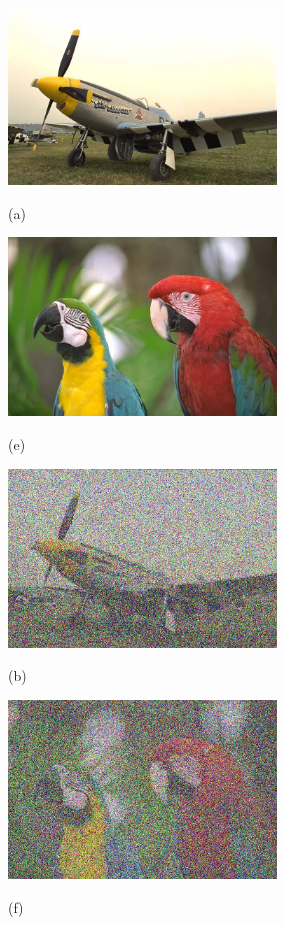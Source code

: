 	\begin{figure}[!]
		\centering
		\begin{minipage}[t]{.49\linewidth}
			\includegraphics[width=2.8in]{LIVE/REF/plane.jpg}
			\centerline{(a)}
		\end{minipage}
		\begin{minipage}[t]{.49\linewidth}
			\includegraphics[width=2.8in]{LIVE/REF/parrots.jpg}
			\centerline{(e)}
		\end{minipage}
	
		\begin{minipage}[t]{.49\linewidth}
			\includegraphics[width=2.8in]{LIVE/WN/img105.jpg}
			\centerline{(b)}
		\end{minipage}
		\begin{minipage}[t]{.49\linewidth}
			\includegraphics[width=2.8in]{LIVE/WN/img104.jpg}
			\centerline{(f)}
		\end{minipage}
	

\end{figure}
